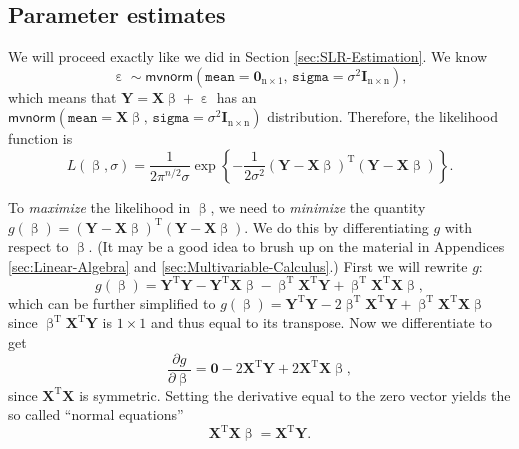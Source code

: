 \documentclass[captions=tableheading]{scrbook}
\begin{document}
\label{sec:Estimation-and-Prediction-MLR}
\subsection{Parameter estimates}
\label{sec-7-2-1}

\label{sub:mlr-parameter-estimates}

We will proceed exactly like we did in Section \ref{sec:SLR-Estimation}. We know
\begin{equation}
\upepsilon\sim\mathsf{mvnorm}\left(\mathtt{mean}=\mathbf{0}_{\mathrm{n}\times1},\,\mathtt{sigma}=\sigma^{2}\mathbf{I}_{\mathrm{n}\times\mathrm{n}}\right),
\end{equation}
which means that \(\mathbf{Y}=\mathbf{X}\upbeta+\upepsilon\) has an \(\mathsf{mvnorm}\left(\mathtt{mean}=\mathbf{X}\upbeta,\,\mathtt{sigma}=\sigma^{2}\mathbf{I}_{\mathrm{n}\times\mathrm{n}}\right)\) distribution. Therefore, the likelihood function is
\begin{equation}
L(\upbeta,\sigma)=\frac{1}{2\pi^{n/2}\sigma}\exp\left\{ -\frac{1}{2\sigma^{2}}\left(\mathbf{Y}-\mathbf{X}\upbeta\right)^{\mathrm{T}}\left(\mathbf{Y}-\mathbf{X}\upbeta\right)\right\}.
\end{equation}

To \emph{maximize} the likelihood in \(\upbeta\), we need to \emph{minimize} the quantity \(g(\upbeta)=\left(\mathbf{Y}-\mathbf{X}\upbeta\right)^{\mathrm{T}}\left(\mathbf{Y}-\mathbf{X}\upbeta\right)\). We do this by differentiating \(g\) with respect to \(\upbeta\). (It may be a good idea to brush up on the material in Appendices \ref{sec:Linear-Algebra} and \ref{sec:Multivariable-Calculus}.) First we will rewrite \(g\):
\begin{equation}
g(\upbeta)=\mathbf{Y}^{\mathrm{T}}\mathbf{Y}-\mathbf{Y}^{\mathrm{T}}\mathbf{X}\upbeta-\upbeta^{\mathrm{T}}\mathbf{X}^{\mathrm{T}}\mathbf{Y}+\upbeta^{\mathrm{T}}\mathbf{X}^{\mathrm{T}}\mathbf{X}\upbeta,
\end{equation}
which can be further simplified to \(g(\upbeta)=\mathbf{Y}^{\mathrm{T}}\mathbf{Y}-2\upbeta^{\mathrm{T}}\mathbf{X}^{\mathrm{T}}\mathbf{Y}+\upbeta^{\mathrm{T}}\mathbf{X}^{\mathrm{T}}\mathbf{X}\upbeta\) since \(\upbeta^{\mathrm{T}}\mathbf{X}^{\mathrm{T}}\mathbf{Y}\) is \(1\times1\) and thus equal to its transpose. Now we differentiate to get
\begin{equation}
\frac{\partial g}{\partial\upbeta}=\mathbf{0}-2\mathbf{X}^{\mathrm{T}}\mathbf{Y}+2\mathbf{X}^{\mathrm{T}}\mathbf{X}\upbeta,
\end{equation}
since \(\mathbf{X}^{\mathrm{T}}\mathbf{X}\) is symmetric. Setting the derivative equal to the zero vector yields the so called ``normal equations''
\begin{equation}
\mathbf{X}^{\mathrm{T}}\mathbf{X}\upbeta=\mathbf{X}^{\mathrm{T}}\mathbf{Y}.
\end{equation}
\end{document}
